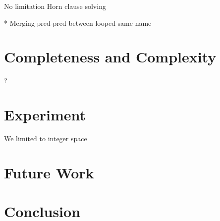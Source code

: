 \documentclass{llncs}
\begin{document}
No limitation Horn clause solving

* Merging pred-pred between looped same name


\section{Completeness and Complexity}

?

\section{Experiment}

We limited to integer space

\section{Future Work}
\section{Conclusion}



\end{document}
